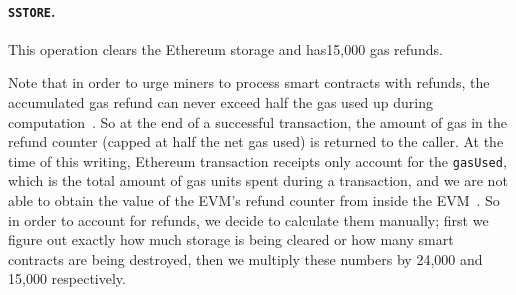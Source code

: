 \paragraph{\texttt{SSTORE}.} This operation clears the Ethereum storage and has15,000 gas refunds. 


Note that in order to urge miners to process smart contracts with refunds, the accumulated gas refund can never exceed half the gas used up during computation~\cite{wood2014ethereum}. So at the end of a successful transaction, the amount of gas in the refund counter (capped at half the net gas used) is returned to the caller. At the time of this writing, Ethereum transaction receipts only account for the \texttt{gasUsed}, which is the total amount of gas units spent during a transaction, and we are not able to obtain the value of the EVM's refund counter from inside the EVM~\cite{signer2018gas}. So in order to account for refunds, we decide to calculate them manually; first we figure out exactly how much storage is being cleared or how many smart contracts are being destroyed, then we multiply these numbers by 24,000 and 15,000 respectively. 




%




